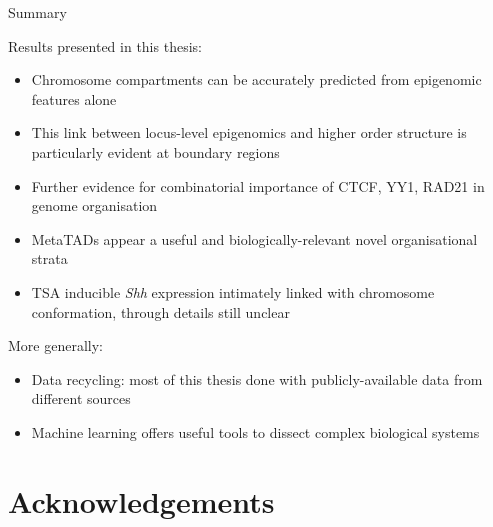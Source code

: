 \documentclass{beamer}
\begin{document}
\begin{frame}{Summary}

\small

Results presented in this thesis:
\begin{itemize}
\item Chromosome compartments can be accurately predicted from epigenomic features alone
\item This link between locus-level epigenomics and higher order structure is particularly evident at boundary regions
\item Further evidence for combinatorial importance of CTCF, YY1, RAD21 in genome organisation
\item MetaTADs appear a useful and biologically-relevant novel organisational strata
\item TSA inducible \emph{Shh} expression intimately linked with chromosome conformation, through details still unclear
\end{itemize}
\vspace{.5em}
More generally:
\begin{itemize}
\item Data recycling: most of this thesis done with publicly-available data from different sources
\item Machine learning offers useful tools to dissect complex biological systems
\end{itemize}
 
 
\end{frame}

\section{Acknowledgements}
\end{document}
